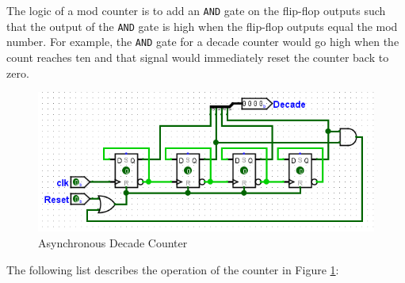 The logic of a  mod counter is to add an \texttt{AND} gate on the flip-flop outputs such that the output of the \texttt{AND} gate is high when the flip-flop outputs equal the mod number. For example, the \texttt{AND} gate for a decade counter would go high when the count reaches ten and that signal would immediately reset the counter back to zero.

\begin{figure}[H]
	\centering
	\includegraphics[width=\maxwidth{.95\linewidth}]{gfx/06-03}
	\caption{Asynchronous Decade Counter}
	\label{fig:06-03}
\end{figure}

The following list describes the operation of the counter in Figure \ref{fig:06-03}:

